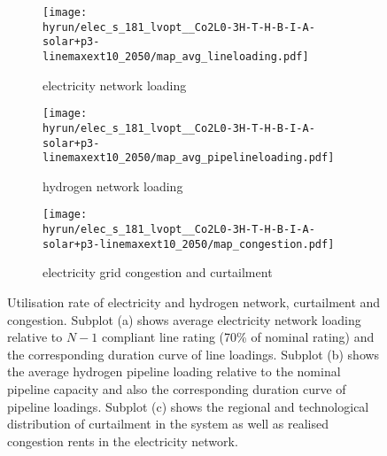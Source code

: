 \begin{figure}
    \centering
    \begin{subfigure}{0.49\textwidth}
        \centering
        \caption{electricity network loading}
        \texttt{[image: \\hyrun/elec\_s\_181\_lvopt\_\_Co2L0-3H-T-H-B-I-A-solar+p3-linemaxext10\_2050/map\_avg\_lineloading.pdf]}
    \end{subfigure}
    \begin{subfigure}{0.49\textwidth}
        \centering
        \caption{hydrogen network loading}
        \texttt{[image: \\hyrun/elec\_s\_181\_lvopt\_\_Co2L0-3H-T-H-B-I-A-solar+p3-linemaxext10\_2050/map\_avg\_pipelineloading.pdf]}
    \end{subfigure}
    \begin{subfigure}{0.65\textwidth}
        \vspace{1cm}
        \centering
        \caption{electricity grid congestion and curtailment}
        \texttt{[image: \\hyrun/elec\_s\_181\_lvopt\_\_Co2L0-3H-T-H-B-I-A-solar+p3-linemaxext10\_2050/map\_congestion.pdf]}
    \end{subfigure}
    \caption{Utilisation rate of electricity and hydrogen network, curtailment and congestion. Subplot (a) shows average electricity network loading relative to $N-1$ compliant line rating (70\% of nominal rating) and the corresponding duration curve of line loadings. Subplot (b) shows the average hydrogen pipeline loading relative to the nominal pipeline capacity and also the corresponding duration curve of pipeline loadings. Subplot (c) shows the regional and technological distribution of curtailment in the system as well as realised congestion rents in the electricity network.}
    \label{fig:si:grid-utilisation}
\end{figure}
